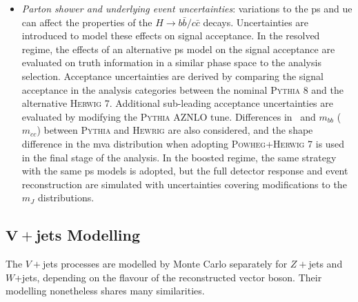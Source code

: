 \begin{itemize}[leftmargin=*]
    \item \textit{Parton shower and underlying event uncertainties}: variations to the \gls{ps} and \gls{ue} can affect the properties of the $H \rightarrow b\bar{b} / c\bar{c}$ decays. Uncertainties are introduced to model these effects on signal acceptance. In the resolved regime, the effects of an alternative \gls{ps} model on the signal acceptance are evaluated on truth information in a similar phase space to the analysis selection. Acceptance uncertainties are derived by comparing the signal acceptance in the analysis categories between the nominal \textsc{Pythia} 8 and the alternative \textsc{Herwig} 7. Additional sub-leading acceptance uncertainties are evaluated by modifying the \textsc{Pythia} AZNLO tune. Differences in \ptv\ and $m_{bb}$ ($m_{cc}$) between \textsc{Pythia} and \textsc{Hewrig} are also considered, and the shape difference in the \gls{mva} distribution when adopting \textsc{Powheg}+\textsc{Herwig} 7 is used in the final stage of the analysis. In the boosted regime, the same strategy with the same \gls{ps} models is adopted, but the full detector response and event reconstruction are simulated with uncertainties covering modifications to the $m_J$ distributions.
\end{itemize}

\subsection[$V+$jets Modelling]{$\boldsymbol{V+}$jets Modelling}\label{sec-modVjet}
The $V+$jets processes are modelled by Monte Carlo separately for $Z+$jets and $W$+jets, depending on the flavour of the reconstructed vector boson. Their modelling nonetheless shares many similarities.

